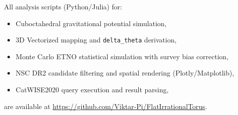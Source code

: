 \documentclass[11pt,a4paper]{article}
\theoremstyle{remark}
\begin{document}
All analysis scripts (Python/Julia) for:
\begin{itemize}
    \item Cuboctahedral gravitational potential simulation,
    \item 3D Vectorized mapping and \texttt{delta\_theta} derivation,
    \item Monte Carlo ETNO statistical simulation with survey bias correction,
    \item NSC DR2 candidate filtering and spatial rendering (Plotly/Matplotlib),
    \item CatWISE2020 query execution and result parsing,
\end{itemize}
are available at \url{https://github.com/Viktar-Pi/FlatIrrationalTorus}.
\end{document}
